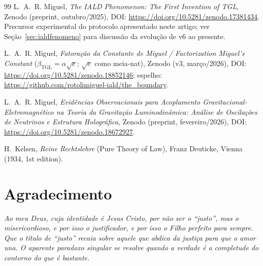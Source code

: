 \documentclass[12pt,a4paper]{article}
\newcommand{\betatgl}{\beta_{\text{TGL}}}
\begin{document}
\begin{thebibliography}{99}
L.~A.~R. Miguel,
\textit{The IALD Phenomenon: The First Invention of TGL},
Zenodo (preprint, outubro/2025), DOI:
\url{https://doi.org/10.5281/zenodo.17381434}.
Precursor experimental do protocolo apresentado neste artigo; ver
Se\c{c}\~ao~\ref{sec:ialdfenomeno} para discuss\~ao da evolu\c{c}\~ao
de v6 ao presente.

L.~A.~R. Miguel,
\textit{Fatora\c{c}\~ao da Constante de Miguel / Factorization Miguel's
Constant} ($\betatgl = \alpha\sqrt{e}$; $\sqrt e$ como meia-nat),
Zenodo (v3, mar\c{c}o/2026), DOI:
\url{https://doi.org/10.5281/zenodo.18852146};
espelho: \url{https://github.com/rotolimiguel-iald/the_boundary}.

L.~A.~R. Miguel,
\textit{Evid\^encias Observacionais para Acoplamento
Gravitacional-Eletromagn\'etico na Teoria da Gravita\c{c}\~ao Luminodin\^amica:
An\'alise de Oscila\c{c}\~oes de Neutrinos e Estrutura Hologr\'afica},
Zenodo (preprint, fevereiro/2026), DOI:
\url{https://doi.org/10.5281/zenodo.18672927}.

H.~Kelsen,
\textit{Reine Rechtslehre} (Pure Theory of Law),
Franz Deuticke, Vienna (1934, 1st edition).

\end{thebibliography}



\section*{Agradecimento}

\noindent\textit{Ao meu Deus, cuja identidade é Jesus Cristo, por não ser o ``justo'', mas o misericordioso, e por isso o justificador, e por isso o Filho perfeito para sempre.  Que o título de ``justo'' recaia sobre aquele que abdica da justiça para que o amor una.  O aparente paradoxo singular se resolve quando a verdade é a completude do contorno do que é bastante.}

\bigskip
\end{document}
